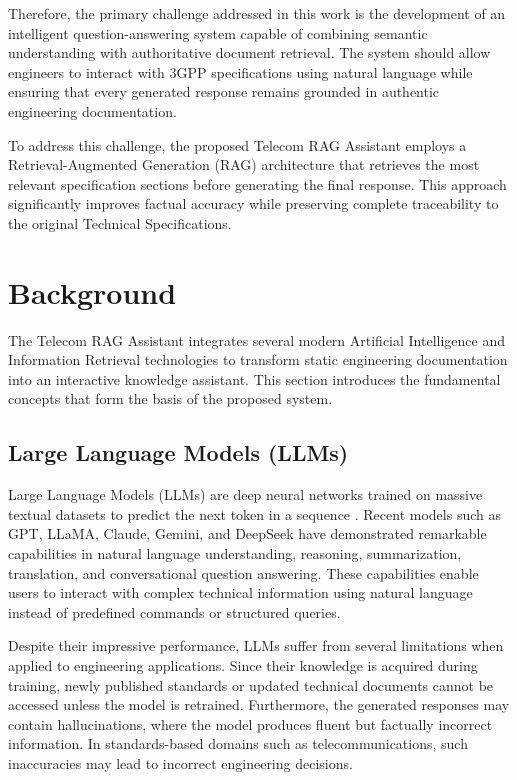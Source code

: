 Therefore, the primary challenge addressed in this work is the development of an intelligent question-answering system capable of combining semantic understanding with authoritative document retrieval. The system should allow engineers to interact with 3GPP specifications using natural language while ensuring that every generated response remains grounded in authentic engineering documentation.

To address this challenge, the proposed Telecom RAG Assistant employs a Retrieval-Augmented Generation (RAG) architecture that retrieves the most relevant specification sections before generating the final response. This approach significantly improves factual accuracy while preserving complete traceability to the original Technical Specifications.

\section{Background}

The Telecom RAG Assistant integrates several modern Artificial Intelligence and Information Retrieval technologies to transform static engineering documentation into an interactive knowledge assistant. This section introduces the fundamental concepts that form the basis of the proposed system.

\subsection{Large Language Models (LLMs)}

Large Language Models (LLMs) are deep neural networks trained on massive textual datasets to predict the next token in a sequence \cite{goodfellow2016}.
Recent models such as GPT, LLaMA, Claude, Gemini, and DeepSeek have demonstrated remarkable capabilities in natural language understanding, reasoning, summarization, translation, and conversational question answering. These capabilities enable users to interact with complex technical information using natural language instead of predefined commands or structured queries.

Despite their impressive performance, LLMs suffer from several limitations when applied to engineering applications. Since their knowledge is acquired during training, newly published standards or updated technical documents cannot be accessed unless the model is retrained. Furthermore, the generated responses may contain hallucinations, where the model produces fluent but factually incorrect information. In standards-based domains such as telecommunications, such inaccuracies may lead to incorrect engineering decisions.

